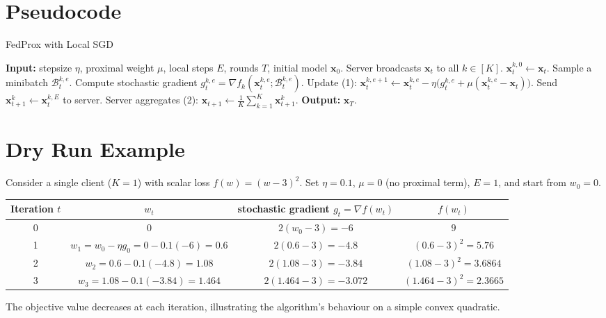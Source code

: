 \documentclass{article}
\begin{document}
\section*{Pseudocode}
\begin{algorithm}[H]
\caption{FedProx with Local SGD}
\begin{algorithmic}[1]
\STATE \textbf{Input:} stepsize $\eta$, proximal weight $\mu$, local steps $E$, rounds $T$,
initial model $\mathbf{x}_0$.
    \STATE Server broadcasts $\mathbf{x}_t$ to all $k\in[K]$.
        \STATE $\mathbf{x}_{t}^{k,0}\gets\mathbf{x}_t$.
            \STATE Sample a minibatch $\mathcal{B}_{t}^{k,e}$.
            \STATE Compute stochastic gradient 
            $g_{t}^{k,e}= \nabla f_k(\mathbf{x}_{t}^{k,e};\mathcal{B}_{t}^{k,e})$.
            \STATE Update (1):
            $\displaystyle\mathbf{x}_{t}^{k,e+1}
                \gets \mathbf{x}_{t}^{k,e}
                -\eta\bigl(g_{t}^{k,e}+\mu(\mathbf{x}_{t}^{k,e}-\mathbf{x}_t)\bigr)$.
        \ENDFOR
        \STATE Send $\mathbf{x}_{t+1}^k\gets\mathbf{x}_{t}^{k,E}$ to server.
    \ENDFOR
    \STATE Server aggregates (2): $\displaystyle\mathbf{x}_{t+1}\gets\frac1K\sum_{k=1}^K\mathbf{x}_{t+1}^k$.
\ENDFOR
\STATE \textbf{Output:} $\mathbf{x}_T$.
\end{algorithmic}
\end{algorithm}

\section*{Dry Run Example}
Consider a single client ($K=1$) with scalar loss $f(w)=(w-3)^2$.  
Set $\eta=0.1$, $\mu=0$ (no proximal term), $E=1$, and start from $w_0=0$.

\begin{tabular}{c|c|c|c}
Iteration $t$ & $w_t$ & stochastic gradient $g_t=\nabla f(w_t)$ & $f(w_t)$\\\hline
0 & $0$ & $2(w_0-3)=-6$ & $9$\\
1 & $w_1=w_0-\eta g_0=0-0.1(-6)=0.6$ & $2(0.6-3)=-4.8$ & $(0.6-3)^2=5.76$\\
2 & $w_2=0.6-0.1(-4.8)=1.08$ & $2(1.08-3)=-3.84$ & $(1.08-3)^2=3.6864$\\
3 & $w_3=1.08-0.1(-3.84)=1.464$ & $2(1.464-3)=-3.072$ & $(1.464-3)^2=2.3665$
\end{tabular}

The objective value decreases at each iteration, illustrating the algorithm’s behaviour on a simple convex quadratic.
\end{document}
